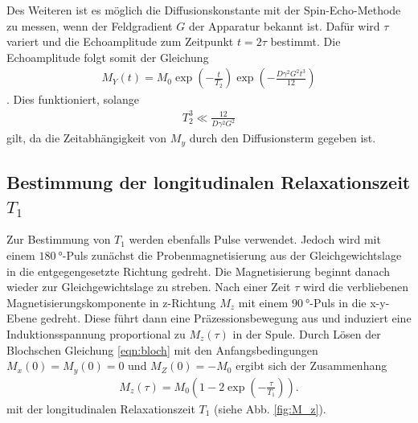 Des Weiteren ist es möglich die
Diffusionskonstante mit der Spin-Echo-Methode
zu messen, wenn der Feldgradient $G$ der Apparatur bekannt ist.
Dafür wird $\tau$ variert und die Echoamplitude zum Zeitpunkt $t=2\tau$ bestimmt.
Die Echoamplitude folgt somit der Gleichung
\begin{align}
M_Y(t) = M_0\exp\left(-\frac{t}{T_2}\right)
\exp\left(-\frac{D\gamma^2 G^2 t^3}{12}\right) \label{eqn:32}
\end{align}.
Dies funktioniert, solange
\begin{align}
  T_2^3 \ll \frac{12}{D\gamma^2 G^2}
\end{align}
gilt, da die Zeitabhängigkeit von $M_y$ durch den Diffusionsterm gegeben ist.

\subsection{Bestimmung der longitudinalen Relaxationszeit $T_1$}
\label{subsec:t1}
Zur Bestimmung von $T_1$ werden ebenfalls Pulse verwendet.
Jedoch wird mit einem $\SI{180}{\degree}$-Puls zunächst die Probenmagnetisierung
aus der Gleichgewichtslage in die entgegengesetzte
Richtung gedreht. Die Magnetisierung beginnt danach
wieder zur Gleichgewichtslage zu streben.
Nach einer Zeit $\tau$ wird
die verbliebenen Magnetisierungskomponente in z-Richtung $M_z$
mit einem $\SI{90}{\degree}$-Puls in die x-y-Ebene gedreht.
Diese führt dann eine Präzessionsbewegung aus und induziert eine
Induktionsspannung proportional zu $M_z(\tau)$ in der Spule.
Durch Lösen der Blochschen Gleichung \eqref{eqn:bloch}
mit den Anfangsbedingungen $M_x(0)=M_y(0)=0$ und $M_Z(0)=-M_0$
ergibt sich der Zusammenhang
\begin{align}
  M_z(\tau) = M_0 \left(1 - 2 \exp\left(-\frac{\tau}{T_1}\right)\right). \label{eqn:33}
\end{align}
mit der longitudinalen Relaxationszeit $T_1$ (siehe Abb. \ref{fig:M_z}).

